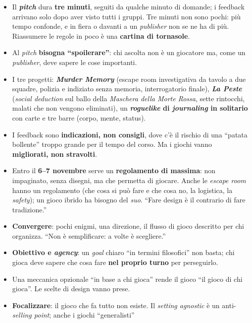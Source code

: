 \begin{itemize}
  \item Il \textbf{\emph{pitch}} dura \textbf{tre minuti}, seguiti da qualche minuto di
        domande; i feedback arrivano solo dopo aver visto tutti i gruppi. Tre minuti non
        sono pochi: più tempo confonde, e in fiera o davanti a un \emph{publisher} non se
        ne ha di più. Riassumere le regole in poco è una \textbf{cartina di tornasole}.
  \item Al \emph{pitch} \textbf{bisogna ``spoilerare''}: chi ascolta non è un giocatore ma,
        come un \emph{publisher}, deve sapere le cose importanti.
  \item I tre progetti: \textbf{\emph{Murder Memory}} (escape room investigativa da
        tavolo a due squadre, polizia e indiziato senza memoria, interrogatorio finale),
        \textbf{\emph{La Peste}} (\emph{social deduction} sul ballo della \emph{Maschera
        della Morte Rossa}, sette rintocchi, malati che non vengono eliminati), un
        \textbf{\emph{roguelike} di \emph{journaling} in solitario} con carte e tre barre
        (corpo, mente, status).
  \item I feedback sono \textbf{indicazioni, non consigli}, dove c'è il rischio di una
        ``patata bollente'' troppo grande per il tempo del corso. Ma i giochi vanno
        \textbf{migliorati, non stravolti}.
  \item Entro il \textbf{6--7 novembre} serve un \textbf{regolamento di massima}: non
        impaginato, senza disegni, ma che permetta di giocare. Anche le \emph{escape
        room} hanno un regolamento (che cosa si può fare e che cosa no, la logistica,
        la \emph{safety}); un gioco ibrido ha bisogno del \emph{suo}. ``Fare design è il
        contrario di fare tradizione.''
  \item \textbf{Convergere}: pochi enigmi, una direzione, il flusso di gioco descritto
        per chi organizza. ``Non è semplificare: a volte è scegliere.''
  \item \textbf{Obiettivo e \emph{agency}}: un \emph{goal} chiaro ``in termini
        filosofici'' non basta; chi gioca deve sapere che cosa fare \textbf{nel proprio
        turno} per perseguirlo.
  \item Una meccanica opzionale ``in base a chi gioca'' rende il gioco ``il gioco di chi
        gioca''. Le scelte di design vanno prese.
  \item \textbf{Focalizzare}: il gioco che fa tutto non esiste. Il \emph{setting
        agnostic} è un anti-\emph{selling point}; anche i giochi ``generalisti''

\end{itemize}
